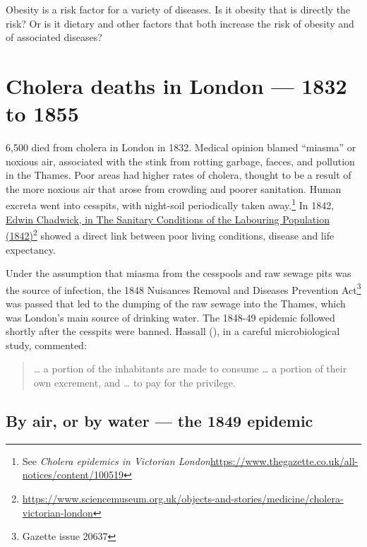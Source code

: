 \documentclass[
  10ptls,
  b5paper]{book}
\begin{document}
Obesity is a risk factor for a variety of diseases. Is it obesity that is directly the risk? Or is it dietary and other factors that both increase the risk of obesity and of associated diseases?

\section{Cholera deaths in London --- 1832 to 1855}\label{cholera-deaths-in-london-1832-to-1855}

6,500 died from cholera in London in 1832. Medical opinion blamed ``miasma'' or noxious air, associated with the stink from rotting garbage, faeces, and pollution in the Thames. Poor areas had higher rates of cholera, thought to be a result of the more noxious air that arose from crowding and poorer sanitation. Human excreta went into cesspits, with night-soil periodically taken away.\footnote{See \emph{Cholera epidemics in Victorian London}\newline \url{https://www.thegazette.co.uk/all-notices/content/100519}} In 1842, \href{https://www.sciencemuseum.org.uk/objects-and-stories/medicine/cholera-victorian-london}{Edwin Chadwick, in The Sanitary Conditions of the Labouring Population (1842)}\footnote{\url{https://www.sciencemuseum.org.uk/objects-and-stories/medicine/cholera-victorian-london}} showed a direct link between poor living conditions, disease and life expectancy.

Under the assumption that miasma from the cesspools and raw sewage pits was the source of infection, the 1848 Nuisances Removal and Diseases Prevention Act\footnote{Gazette issue 20637} was passed that led to the dumping of the raw sewage into the Thames, which was London's main source of drinking water. The 1848-49 epidemic followed shortly after the cesspits were banned. Hassall (), in a careful microbiological study, commented:

\begin{quote}
\ldots{} a portion of the inhabitants are made to consume \ldots{} a portion of their own excrement, and \ldots{} to pay for the privilege.
\end{quote}

\subsection*{By air, or by water --- the 1849 epidemic}\label{by-air-or-by-water-the-1849-epidemic}
\end{document}
